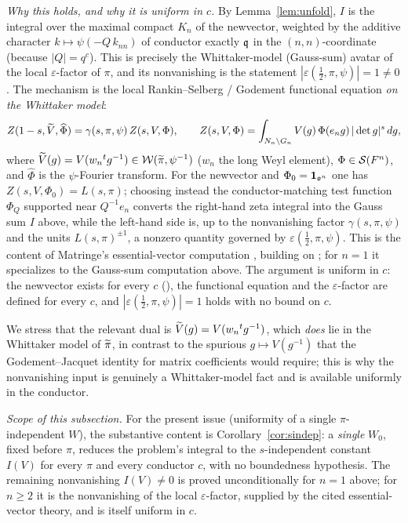 \noindent\emph{Why this holds, and why it is uniform in $c$.} By Lemma~\ref{lem:unfold},
$I$ is the integral over the maximal compact $K_n$ of the newvector, weighted by the additive
character $k\mapsto\psi(-Q\,k_{nn})$ of conductor exactly $\mathfrak{q}$ in the $(n,n)$-coordinate
\textup{(}because $|Q|=q^{c}$\textup{)}. This is precisely the Whittaker-model
\textup{(}Gauss-sum\textup{)} avatar of the local $\varepsilon$-factor of $\pi$, and its
nonvanishing is the statement $|\varepsilon(\tfrac12,\pi,\psi)|=1\neq0$. The mechanism is the
local Rankin--Selberg / Godement functional equation \emph{on the Whittaker model}:
\[
Z(1-s,\widetilde{V},\widehat\Phi)=\gamma(s,\pi,\psi)\,Z(s,V,\Phi),\qquad
Z(s,V,\Phi)=\int_{N_n\backslash G_n}V(g)\,\Phi(e_n g)\,|\det g|^{s}\,dg,
\]
where $\widetilde{V}(g)=V(w_n{}^{t}g^{-1})\in\mathcal{W}(\widetilde{\pi},\psi^{-1})$ \textup{(}$w_n$ the
long Weyl element\textup{)}, $\Phi\in\mathcal S(F^{n})$, and $\widehat\Phi$ is the
$\psi$-Fourier transform. For the newvector and $\Phi_0=\mathbf 1_{\mathfrak{o}^{n}}$ one has
$Z(s,V,\Phi_0)=L(s,\pi)$; choosing instead the conductor-matching test function
$\Phi_Q$ supported near $Q^{-1}e_n$ converts the right-hand zeta integral into the Gauss sum $I$
above, while the left-hand side is, up to the nonvanishing factor $\gamma(s,\pi,\psi)$ and the
units $L(s,\pi)^{\pm1}$, a nonzero quantity governed by $\varepsilon(\tfrac12,\pi,\psi)$. This is
the content of Matringe's essential-vector computation \cite[Thm.~1.1, \S3]{Matringe}, building on
\cite[\S\S4--5]{JPSS81}; for $n=1$ it specializes to the Gauss-sum computation above. The argument
is uniform in $c$: the newvector exists for every $c$ \textup{(}\cite{JPSS81}\textup{)}, the
functional equation and the $\varepsilon$-factor are defined for every $c$, and
$|\varepsilon(\tfrac12,\pi,\psi)|=1$ holds with no bound on $c$.

\medskip
\noindent We stress that the relevant dual is $\widetilde{V}(g)=V(w_n{}^{t}g^{-1})$, which
\emph{does} lie in the Whittaker model of $\widetilde{\pi}$, in contrast to the spurious
$g\mapsto V(g^{-1})$ that the Godement--Jacquet identity for matrix coefficients would require;
this is why the nonvanishing input is genuinely a Whittaker-model fact and is available uniformly
in the conductor.

\medskip
\noindent\emph{Scope of this subsection.} For the present issue \textup{(}uniformity of a single
$\pi$-independent $W$\textup{)}, the substantive content is Corollary~\ref{cor:sindep}: a
\emph{single} $W_0$, fixed before $\pi$, reduces the problem's integral to the $s$-independent
constant $I(V)$ for every $\pi$ and every conductor $c$, with no boundedness hypothesis. The
remaining nonvanishing $I(V)\neq0$ is proved unconditionally for $n=1$ above; for $n\ge2$ it is
the nonvanishing of the local $\varepsilon$-factor, supplied by the cited essential-vector theory,
and is itself uniform in $c$.

